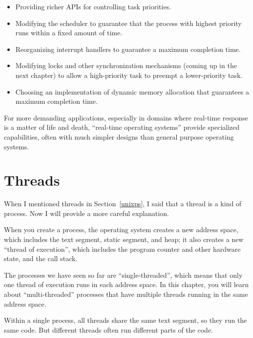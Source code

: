 \documentclass[12pt]{book}
\begin{document}
\begin{itemize}

\item Providing richer APIs for controlling task priorities.

\item Modifying the scheduler to guarantee that the process with
highest priority runs within a fixed amount of time.

\item Reorganizing interrupt handlers to guarantee
a maximum completion time.

\item Modifying locks and other synchronization mechanisms (coming up
  in the next chapter) to allow a high-priority task to preempt a
  lower-priority task.

\item Choosing an implementation of dynamic memory allocation that
guarantees a maximum completion time.

\end{itemize}

For more demanding applications, especially in domains where real-time
response is a matter of life and death, ``real-time operating
  systems'' provide specialized capabilities, often with much simpler
designs than general purpose operating systems.



\chapter{Threads}

When I mentioned threads in Section~\ref{unixps}, I said that a thread
is a kind of process.  Now I will provide a more careful explanation.

When you create a process, the operating system creates a new address
space, which includes the text segment, static segment, and heap; it
also creates a new ``thread of execution'', which includes the program
counter and other hardware state, and the call stack.

The processes we have seen so far are ``single-threaded'', which means
that only one thread of execution runs in each address space.  In this
chapter, you will learn about ``multi-threaded'' processes that have
multiple threads running in the same address space.

Within a single process, all threads share the same text segment, so
they run the same code.  But different threads often run different parts
of the code.
\end{document}
